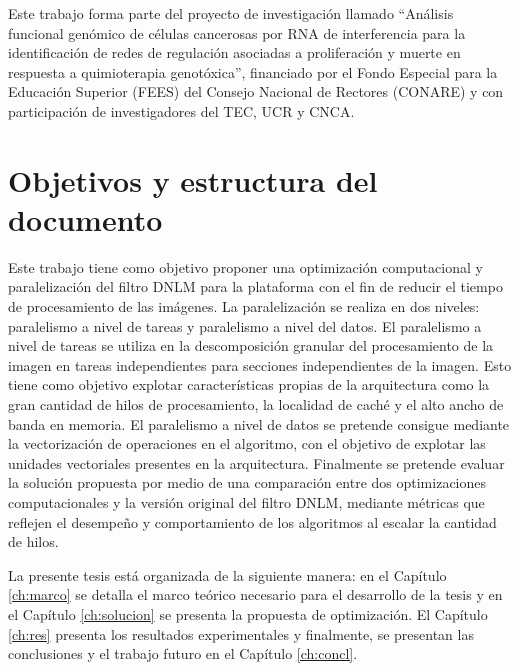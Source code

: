 Este trabajo forma parte del proyecto de investigación llamado ``Análisis funcional genómico de células cancerosas por RNA de interferencia para la identificación de redes de regulación asociadas a proliferación y muerte en respuesta a quimioterapia genotóxica'', financiado por el Fondo Especial para la Educación Superior (FEES) del Consejo Nacional de Rectores (CONARE) y con participación de investigadores del TEC, UCR y CNCA. 


\section{Objetivos y estructura del documento}


Este trabajo tiene como objetivo proponer una optimización computacional y paralelización del filtro DNLM  para la plataforma  con el fin de reducir el tiempo de procesamiento de las imágenes. La paralelización se realiza en dos niveles: paralelismo a nivel de tareas y paralelismo a nivel del datos. El paralelismo a nivel de tareas se utiliza en la descomposición granular del procesamiento de la imagen en tareas independientes para secciones independientes de la imagen. Esto tiene como objetivo explotar características propias de la arquitectura como la gran cantidad de hilos de procesamiento, la localidad de caché y el alto ancho de banda en memoria. El paralelismo a nivel de datos se pretende consigue mediante la vectorización de operaciones en el algoritmo, con el objetivo de explotar las unidades vectoriales presentes en la arquitectura. Finalmente se pretende evaluar la solución propuesta por medio de una comparación entre dos optimizaciones computacionales y la versión original del filtro DNLM, mediante métricas que reflejen el desempeño y comportamiento de los algoritmos al escalar la cantidad de hilos.


La presente tesis está organizada de la siguiente manera: en el Capítulo \ref{ch:marco} se detalla el marco teórico necesario para el desarrollo de la tesis y en el Capítulo \ref{ch:solucion} se presenta la propuesta de optimización. El Capítulo \ref{ch:res} presenta los resultados experimentales y finalmente, se presentan las conclusiones y el trabajo futuro en el Capítulo \ref{ch:concl}. 
